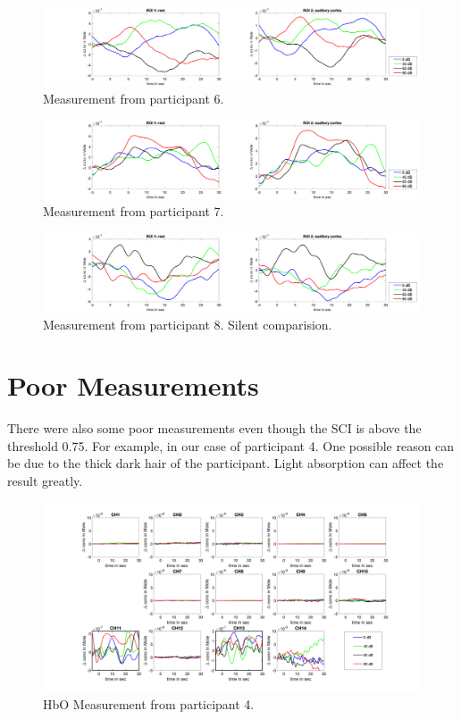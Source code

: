 \begin{figure}[H]
  \centering
    \includegraphics[scale=.29]{bilder/ROI/sub_shelia_s_HbO.png}
  \caption{Measurement from participant  6.}
  \label{fig:somesignal}
\end{figure}


\begin{figure}[H]
  \centering
    \includegraphics[scale=.29]{bilder/ROI/sub_liao_s_HbO.png}
  \caption{Measurement from participant 7.}
  \label{fig:somesignal}
\end{figure}



\begin{figure}[H]
  \centering
    \includegraphics[scale=.29]{bilder/ROI/sub_luca2_s_HbO.png}
  \caption{Measurement from participant 8. Silent comparision.}
  \label{fig:somesignal}
\end{figure}

\newpage

\section {Poor Measurements}
There were also some poor measurements even though the SCI is above the threshold 0.75. For example, in our case of participant 4. One possible reason can be due to the thick dark hair of the participant. Light absorption can affect the result greatly.

\begin{figure}[H]
  \centering
    \includegraphics[scale=.35]{bilder/HbO_Mole/sub_lin_s_HbO.png}
  \caption{HbO Measurement from participant 4.}
  \label{fig:somesignal}
\end{figure}


